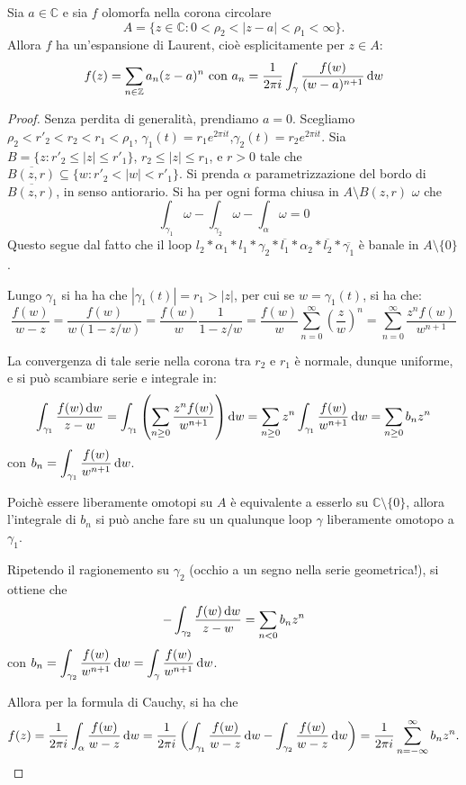 \begin{thm}
    Sia $a\in\mathbb{C}$ e sia $f$ olomorfa nella corona circolare
    \[
        A = \{z\in\mathbb{C}:0<\rho_2<|z-a|<\rho_1<\infty\}.
    \]
    Allora $f$ ha un'espansione di Laurent, cio\`e esplicitamente per $z\in A$:
    \[
        f(z) = \sum_{n\in\mathbb{Z}}a_n(z-a)^n \text{\ con\ }
        a_n = \frac{1}{2\pi i} \int_\gamma \frac{f(w)}{(w-a)^{n+1}}\mathop{}\!\mathrm{d} w
    \]
\end{thm}
\begin{proof}
    Senza perdita di generalit\`a, prendiamo $a=0$. Scegliamo $\rho_2 <
    r'_2<r_2<r_1<\rho_1$, $\gamma_1(t)=r_1e^{2\pi i t}$,$\gamma_2(t)=r_2e^{2\pi
    i t}$.
    Sia $B=\{z: r'_2\leq |z| \leq r'_1\}$, $r_2\leq |z| \leq r_1$, e $r>0$ tale
    che $\overline{B(z,r)}\subseteq \{w: r'_2<|w|<r'_1\}$. Si prenda $\alpha$
    parametrizzazione del bordo di $\overline{B(z,r)}$, in senso antiorario.
    Si ha per ogni forma chiusa in $A\setminus B(z,r)$ $\omega$ che
    \[
        \int_{\gamma_1}\omega-\int_{\gamma_2}\omega-\int_{\alpha}\omega=0
    \]
    Questo segue dal fatto che il loop $l_2 * \alpha_1 * l_1 * \gamma_2 *
    \overline{l_1} * \alpha_2 * \overline{l_2} * \overline{\gamma_1}$ \`e banale
    in $A\setminus\{0\}$.

    Lungo $\gamma_1$ si ha ha che $|\gamma_1(t)| = r_1 > |z|$, per cui se $w =
    \gamma_1(t)$, si ha che:
    \[
        \frac{f(w)}{w-z} = \frac{f(w)}{w(1-z/w)} = \frac{f(w)}{w}\frac{1}{1-z/w}
        = \frac{f(w)}{w} \sum_{n=0}^\infty \left(\frac{z}{w}\right)^n =
        \sum_{n=0}^\infty \frac{z^nf(w)}{w^{n+1}}
    \]

    La convergenza di tale serie nella corona tra $r_2$ e $r_1$ \`e normale,
    dunque uniforme, e si pu\`o scambiare serie e integrale in:
    \[
        \int_{\gamma_1} \frac{f(w)\mathop{}\!\mathrm{d} w}{z-w} =
        \int_{\gamma_1} \left(\sum_{n\geq 0}\frac{z^nf(w)}{w^{n+1}}\right)\mathop{}\!\mathrm{d} w =
        \sum_{n\geq 0}z^n\int_{\gamma_1} \frac{f(w)}{w^{n+1}}\mathop{}\!\mathrm{d} w =
        \sum_{n\geq 0}b_n z^n
    \]
    con $\displaystyle b_n=\int_{\gamma_1} \frac{f(w)}{w^{n+1}}\mathop{}\!\mathrm{d} w$.

    Poich\`e essere liberamente omotopi su $A$ \`e equivalente a esserlo su
    $\mathbb{C}\setminus\{0\}$, allora l'integrale di $b_n$ si pu\`o anche fare
    su un qualunque loop $\gamma$ liberamente omotopo a $\gamma_1$.

    Ripetendo il ragionemento su $\gamma_2$ (occhio a un segno nella serie
    geometrica!), si ottiene che
    \[
        -\int_{\gamma_2} \frac{f(w)\mathop{}\!\mathrm{d} w}{z-w} =
        \sum_{n< 0}b_n z^n
    \]
    con $\displaystyle b_n =\int_{\gamma_2} \frac{f(w)}{w^{n+1}}\mathop{}\!\mathrm{d} w = \int_\gamma
    \frac{f(w)}{w^{n+1}}\mathop{}\!\mathrm{d} w$.

    Allora per la  formula di Cauchy, si ha che
    \[
        f(z) = \frac{1}{2\pi i} \int_\alpha \frac{f(w)}{w-z} \mathop{}\!\mathrm{d} w =
        \frac{1}{2\pi i}\left( \int_{\gamma_1} \frac{f(w)}{w-z} \mathop{}\!\mathrm{d} w -
        \int_{\gamma_2} \frac{f(w)}{w-z} \mathop{}\!\mathrm{d} w\right) = \frac{1}{2\pi i}
        \sum_{n=-\infty}^\infty b_n z^n.
    \]
\end{proof}

